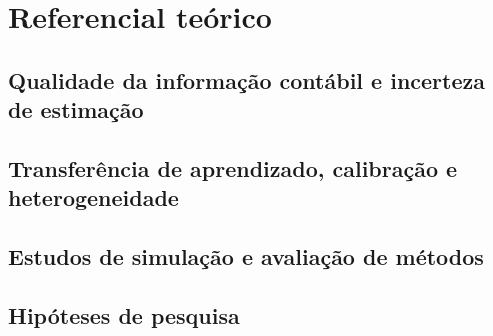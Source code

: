 \section{Referencial teórico}
\label{sec:referencial}
\aescrever


\subsection{Qualidade da informação contábil e incerteza de estimação}
\aescrever


\subsection{Transferência de aprendizado, calibração e heterogeneidade}
\aescrever


\subsection{Estudos de simulação e avaliação de métodos}
\aescrever


\subsection{Hipóteses de pesquisa}
\aescrever
